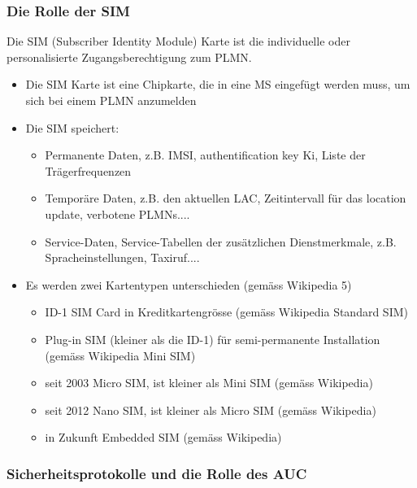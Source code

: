\subsubsection{Die Rolle der SIM}
Die SIM (Subscriber Identity Module) Karte ist die individuelle oder personalisierte Zugangsberechtigung zum PLMN.
\begin{itemize}
\item Die SIM Karte ist eine Chipkarte, die in eine MS eingefügt werden muss, um sich bei einem PLMN anzumelden
\item Die SIM speichert:
\begin{itemize}
\item Permanente Daten, z.B. IMSI, authentification key Ki, Liste der Trägerfrequenzen
\item Temporäre Daten, z.B. den aktuellen LAC, Zeitintervall für das location update, verbotene PLMNs....
\item Service-Daten, Service-Tabellen der zusätzlichen Dienstmerkmale, z.B. Spracheinstellungen, Taxiruf....
\end{itemize}
\item Es werden zwei Kartentypen unterschieden (gemäss Wikipedia 5)
\begin{itemize}
\item ID-1 SIM Card in Kreditkartengrösse (gemäss Wikipedia Standard SIM)
\item Plug-in SIM (kleiner als die ID-1) für semi-permanente Installation (gemäss Wikipedia Mini SIM)
\item seit 2003 Micro SIM, ist kleiner als Mini SIM (gemäss Wikipedia)
\item seit 2012 Nano SIM, ist kleiner als Micro SIM (gemäss Wikipedia)
\item in Zukunft Embedded SIM (gemäss Wikipedia)
\end{itemize}
\end{itemize}

\subsubsection{Sicherheitsprotokolle und die Rolle des AUC}

